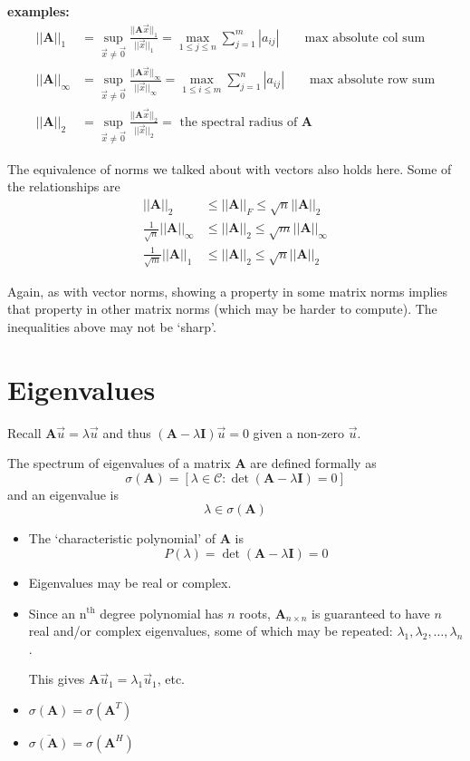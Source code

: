 \documentclass[12pt]{article}
\newcommand{\nth}{n\ensuremath{^{\text{th}}} }
\newcommand{\ve}[1]{\ensuremath{\mathbf{#1}}}
\newcommand{\cc}[1]{\ensuremath{\overline{#1}}}
\begin{document}
\textbf{examples:}
%
\begin{align}
||\ve{A}||_{1} &= \displaystyle \sup_{\vec{x} \neq \vec{0}} \frac{||\ve{A}\vec{x}||_{1}}{||\vec{x}||_{1}} =
\displaystyle \max_{1 \leq j \leq n} \sum_{j=1}^m |a_{ij}| \qquad \text{max absolute col sum} \nonumber \\
%
||\ve{A}||_{\infty} &= \displaystyle \sup_{\vec{x} \neq \vec{0}} \frac{||\ve{A}\vec{x}||_{\infty}}{||\vec{x}||_{\infty}} = 
\displaystyle \max_{1 \leq i \leq m} \sum_{j=1}^n |a_{ij}| \qquad \text{max absolute row sum}\nonumber \\
%
||\ve{A}||_{2} &= \displaystyle \sup_{\vec{x} \neq \vec{0}} \frac{||\ve{A}\vec{x}||_{2}}{||\vec{x}||_{2}} = \text{ the spectral radius of }\ve{A} \nonumber 
\end{align}

The equivalence of norms we talked about with vectors also holds here. Some of the relationships are
%
\begin{align}
||\ve{A}||_{2} &\leq ||\ve{A}||_{F} \leq \sqrt{n}||\ve{A}||_{2} \nonumber \\
%
\frac{1}{\sqrt{n}}||\ve{A}||_{\infty} &\leq ||\ve{A}||_{2} \leq \sqrt{m}||\ve{A}||_{\infty} \nonumber \\
%
\frac{1}{\sqrt{m}}||\ve{A}||_{1} &\leq ||\ve{A}||_{2} \leq \sqrt{n}||\ve{A}||_{2} \nonumber
\end{align}

Again, as with vector norms, showing a property in some matrix norms implies that property in other matrix norms (which may be harder to compute). The inequalities above may not be `sharp'.


\section{Eigenvalues}

Recall $\ve{A} \vec{u} = \lambda \vec{u}$ and thus $(\ve{A} - \lambda \ve{I}) \vec{u}=0$ given a non-zero $\vec{u}$.

The spectrum of eigenvalues of a matrix $\ve{A}$ are defined formally as
\[\sigma(\ve{A}) = [ \lambda \in \mathcal{C} : \det(\ve{A} - \lambda \ve{I})=0] \] 
and an eigenvalue is 
\[ \lambda \in \sigma(\ve{A}) \]
%
\begin{itemize}
\item The `characteristic polynomial' of $\ve{A}$ is
\[P(\lambda) = \det(\ve{A} - \lambda \ve{I}) = 0\]
\item Eigenvalues may be real or complex. 
\item Since an \nth degree polynomial has $n$ roots, $\ve{A}_{n \times n}$ is guaranteed to have $n$ real and/or complex eigenvalues, some of which may be repeated: $\lambda_1, \lambda_2, \dots, \lambda_n$.

This gives $\ve{A}\vec{u}_1 = \lambda_1 \vec{u}_1$, etc.
\item $\sigma(\ve{A}) = \sigma(\ve{A}^T)$
\item $\cc{\sigma(\ve{A})} = \sigma(\ve{A}^H)$
\end{itemize}
\end{document}
